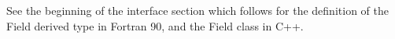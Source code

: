 

See the beginning of the interface section which
follows for the definition of the Field derived type
in Fortran 90, and the Field class in C++.


